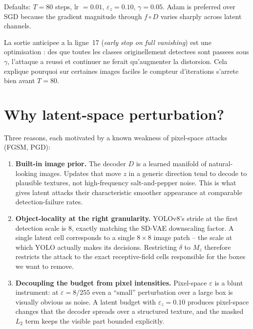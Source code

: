 \documentclass[11pt,a4paper]{article}
\begin{document}
\noindent Defaults: $T = 80$ steps, lr $= 0.01$, $\varepsilon_z = 0.10$,
$\gamma = 0.05$. Adam is preferred over SGD because the gradient magnitude
through $f \circ D$ varies sharply across latent channels.

\begin{supervisornote}
La sortie anticipee a la ligne~17 (\textit{early stop on full vanishing})
est une optimisation : des que toutes les classes originellement detectees
sont passees sous $\gamma$, l'attaque a reussi et continuer ne ferait
qu'augmenter la distorsion. Cela explique pourquoi sur certaines images
faciles le compteur d'iterations s'arrete bien avant $T = 80$.
\end{supervisornote}

\section{Why latent-space perturbation?}\label{sec:why-latent}

Three reasons, each motivated by a known weakness of pixel-space attacks
(FGSM, PGD):

\begin{enumerate}[leftmargin=*, itemsep=2pt]
\item \textbf{Built-in image prior.} The decoder $D$ is a learned manifold
of natural-looking images. Updates that move $z$ in a generic direction
tend to decode to plausible textures, not high-frequency salt-and-pepper
noise. This is what gives latent attacks their characteristic smoother
appearance at comparable detection-failure rates.

\item \textbf{Object-locality at the right granularity.} YOLOv8's stride at
the first detection scale is $8$, exactly matching the SD-VAE downscaling
factor. A single latent cell corresponds to a single $8 \times 8$ image patch
-- the scale at which YOLO actually makes its decisions. Restricting $\delta$
to $M_z$ therefore restricts the attack to the exact receptive-field cells
responsible for the boxes we want to remove.

\item \textbf{Decoupling the budget from pixel intensities.} Pixel-space
$\varepsilon$ is a blunt instrument: at $\varepsilon = 8/255$ even a
``small'' perturbation over a large box is visually obvious as noise. A
latent budget with $\varepsilon_z = 0.10$ produces pixel-space changes that
the decoder spreads over a structured texture, and the masked $L_2$ term
keeps the visible part bounded explicitly.
\end{enumerate}
\end{document}
